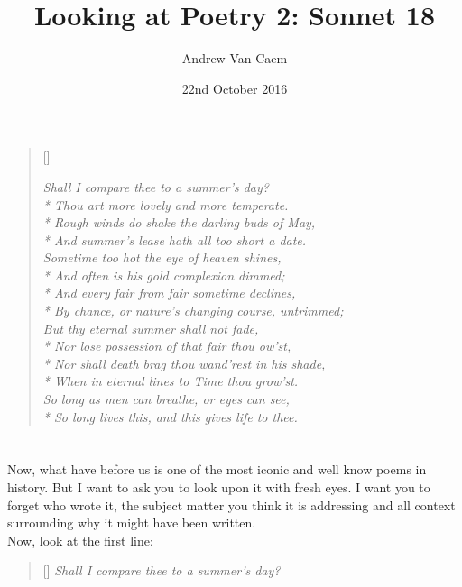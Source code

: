 \documentclass[]{article}
\title{Looking at Poetry 2: Sonnet 18}
\author{Andrew Van Caem}
\date{22nd October 2016}
\begin{document}
\newcommand{\attrib}[1]{%
\nopagebreak{\raggedleft\footnotesize #1\par}}
\renewcommand{\poemtitlefont}{\normalfont\large\itshape\centering}

\settowidth{\versewidth}{Rough winds do shake the darling buds of May,}
\begin{verse}[\versewidth]

	\itshape
	Shall I compare thee to a summer’s day?\\*
	Thou art more lovely and more temperate.\\*
	Rough winds do shake the darling buds of May,\\*
	And summer’s lease hath all too short a date.\\
	Sometime too hot the eye of heaven shines,\\*
	And often is his gold complexion dimmed;\\*
	And every fair from fair sometime declines,\\*
	By chance, or nature’s changing course, untrimmed;\\
	But thy eternal summer shall not fade,\\*
	Nor lose possession of that fair thou ow’st,\\*
	Nor shall death brag thou wand’rest in his shade,\\*
	When in eternal lines to Time thou grow’st.\\
	So long as men can breathe, or eyes can see,\\*
	So long lives this, and this gives life to thee.\\
	\end{verse}
	\attrib{- William Shakespeare}
\section{}

Now, what have before us is one of the most iconic and well know poems in history. But I want to ask you to look upon it with fresh eyes. I want you to forget who wrote it, the subject matter you think it is addressing and all context surrounding why it might have been written.\\

Now, look at the first line:

\begin{verse}[\versewidth]
	\itshape
	Shall I compare thee to a summer’s day?\\
\end{verse}
\end{document}
